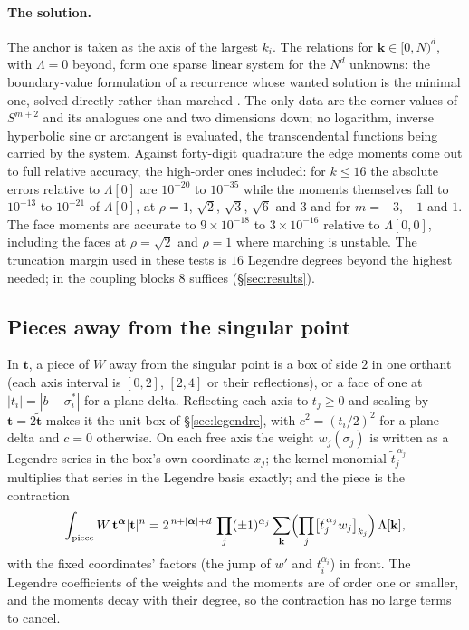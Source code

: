 \documentclass[11pt,a4paper]{article}
\newcommand{\bt}{\mathbf{t}}
\newcommand{\balpha}{\boldsymbol{\alpha}}
\begin{document}
\paragraph{The solution.} The anchor is taken as the axis of the largest $k_i$. The relations for
$\mathbf{k}\in[0,N)^d$, with $\Lambda=0$ beyond, form one sparse linear system for the $N^d$ unknowns:
the boundary-value formulation of a recurrence whose wanted solution is the minimal one, solved directly
rather than marched \citep{Olver1967,OlverSookne1972}. The only data are the corner values of $S^{m+2}$
and its analogues one and two dimensions down; no logarithm, inverse hyperbolic sine or arctangent is
evaluated, the transcendental functions being carried by the system. Against forty-digit quadrature the
edge moments come out to full relative accuracy, the high-order ones included: for $k\le16$ the absolute
errors relative to $\Lambda[0]$ are $10^{-20}$ to $10^{-35}$ while the moments themselves fall to
$10^{-13}$ to $10^{-21}$ of $\Lambda[0]$, at $\rho=1$, $\sqrt2$, $\sqrt3$, $\sqrt6$ and $3$ and for
$m=-3$, $-1$ and $1$. The face moments are accurate to $9\times10^{-18}$ to $3\times10^{-16}$ relative to
$\Lambda[0,0]$, including the faces at $\rho=\sqrt2$ and $\rho=1$ where marching is unstable. The truncation
margin used in these tests is $16$ Legendre degrees beyond the highest needed; in the coupling blocks
$8$ suffices (\S\ref{sec:results}).

\subsection{Pieces away from the singular point}\label{sec:far}

In $\bt$, a piece of $W$ away from the singular point is a box of side $2$ in one orthant (each axis
interval is $[0,2]$, $[2,4]$ or their reflections), or a face of one at $|t_i|=|b-\sigma_i^*|$ for a plane
delta. Reflecting each axis to $t_j\ge0$ and scaling by $\bt=2\tilde{\bt}$ makes it the unit box of
\S\ref{sec:legendre}, with $c^2=(t_i/2)^2$ for a plane delta and $c=0$ otherwise. On each free axis the
weight $w_j(\sigma_j)$ is written as a Legendre series in the box's own coordinate $x_j$; the kernel
monomial $\tilde t_j^{\,\alpha_j}$ multiplies that series in the Legendre basis exactly; and the piece is the
contraction
\begin{equation}\label{eq:farpiece}
  \int_{\text{piece}}W\,\bt^{\balpha}|\bt|^n=2^{\,n+|\balpha|+d}\,\prod_j(\pm1)^{\alpha_j}\sum_{\mathbf{k}}
  \Bigl(\prod_j\bigl[\tilde t_j^{\,\alpha_j}w_j\bigr]_{k_j}\Bigr)\,\Lambda[\mathbf{k}],
\end{equation}
with the fixed coordinates' factors (the jump of $w'$ and $t_i^{\alpha_i}$) in front. The Legendre
coefficients of the weights and the moments are of order one or smaller, and the moments decay with
their degree, so the contraction has no large terms to cancel.
\end{document}
